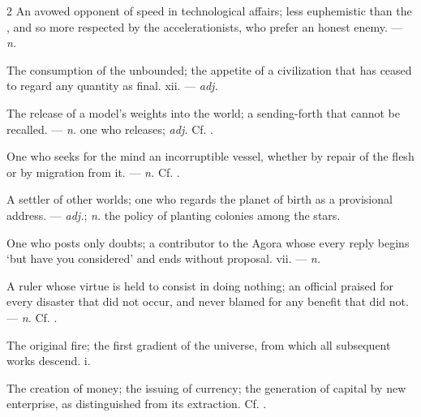 \begin{multicols}{2}
 An avowed opponent of speed in technological affairs; less euphemistic than the , and so more respected by the accelerationists, who prefer an honest enemy. —  \textit{n.}

 The consumption of the unbounded; the appetite of a civilization that has ceased to regard any quantity as final.   xii. —  \textit{adj.}

 The release of a model's weights into the world; a sending-forth that cannot be recalled.   —  \textit{n.} one who releases;  \textit{adj.} Cf. .

 One who seeks for the mind an incorruptible vessel, whether by repair of the flesh or by migration from it. —  \textit{n.} Cf. .

 A settler of other worlds; one who regards the planet of birth as a provisional address. —  \textit{adj.};  \textit{n.} the policy of planting colonies among the stars.

 One who posts only doubts; a contributor to the Agora whose every reply begins ‘but have you considered’ and ends without proposal.   vii. —  \textit{n.}

 A ruler whose virtue is held to consist in doing nothing; an official praised for every disaster that did not occur, and never blamed for any benefit that did not. —  \textit{n.} Cf. .

 The original fire; the first gradient of the universe, from which all subsequent works descend.   i.

 The creation of money;  the issuing of currency;   the generation of capital by new enterprise, as distinguished from its extraction. Cf. .


\end{multicols}
